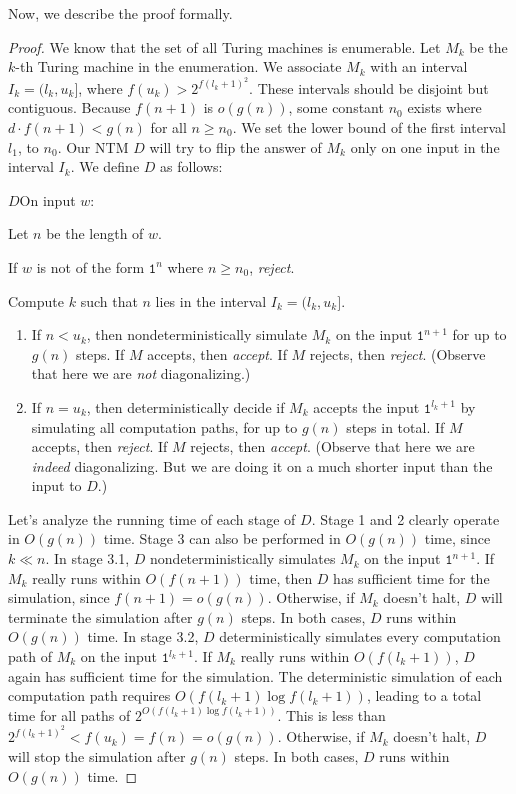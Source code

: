 Now, we describe the proof formally.

\begin{proof}
  We know that the set of all Turing machines is enumerable. Let $M_k$ be the $k$-th Turing machine in the enumeration. We associate $M_k$ with an interval $I_k = (l_k, u_k]$, where $f(u_k) > 2^{f(l_k + 1)^2}$. These intervals should be disjoint but contiguous. Because $f(n + 1)$ is $o(g(n))$, some constant $n_0$ exists where $d \cdot f(n + 1) < g(n)$ for all $n \geq n_0$. We set the lower bound of the first interval $l_1$, to $n_0$. Our NTM $D$ will try to flip the answer of $M_k$ only on one input in the interval $I_k$. We define $D$ as follows:

  \begin{turing}{$D$}{On input $w$:}
  \item Let $n$ be the length of $w$.
  \item If $w$ is not of the form $\texttt{1}^n$ where $n \geq n_0$, \emph{reject}.
  \item Compute $k$ such that $n$ lies in the interval $I_k = (l_k, u_k]$.
    \begin{enumerate}[label=\theenumi\arabic*.]
      \item If $n < u_k$, then nondeterministically simulate $M_k$ on the input $\texttt{1}^{n + 1}$ for up to $g(n)$ steps. If $M$ accepts, then \emph{accept}. If $M$ rejects, then \emph{reject}. (Observe that here we are \emph{not} diagonalizing.)
      \item If $n = u_k$, then deterministically decide if $M_k$ accepts the input $\texttt{1}^{l_k + 1}$ by simulating all computation paths, for up to $g(n)$ steps in total. If $M$ accepts, then \emph{reject}. If $M$ rejects, then \emph{accept}. (Observe that here we are \emph{indeed} diagonalizing. But we are doing it on a much shorter input than the input to $D$.)
    \end{enumerate}
  \end{turing}

  Let's analyze the running time of each stage of $D$. Stage 1 and 2 clearly operate in $O(g(n))$ time. Stage 3 can also be performed in $O(g(n))$ time, since $k \ll n$. In stage 3.1, $D$ nondeterministically simulates $M_k$ on the input $\texttt{1}^{n + 1}$. If $M_k$ really runs within $O(f(n + 1))$ time, then $D$ has sufficient time for the simulation, since $f(n + 1) = o(g(n))$. Otherwise, if $M_k$ doesn't halt, $D$ will terminate the simulation after $g(n)$ steps. In both cases, $D$ runs within $O(g(n))$ time. In stage 3.2, $D$ deterministically simulates every computation path of $M_k$ on the input $\texttt{1}^{l_k + 1}$. If $M_k$ really runs within $O(f(l_k + 1))$, $D$ again has sufficient time for the simulation. The deterministic simulation of each computation path requires $O(f(l_k + 1) \log f(l_k + 1))$, leading to a total time for all paths of $2^{O(f(l_k + 1) \log f(l_k + 1))}$. This is less than $2^{f(l_k + 1)^2} < f(u_k) = f(n) = o(g(n))$. Otherwise, if $M_k$ doesn't halt, $D$ will stop the simulation after $g(n)$ steps. In both cases, $D$ runs within $O(g(n))$ time.


\end{proof}
